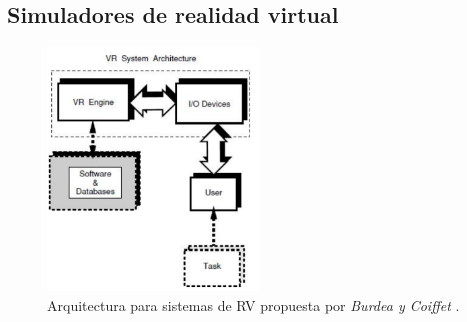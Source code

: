 \subsection{Simuladores de realidad virtual}
\label{art:simulador}

\begin{figure}[h]
   \centering
    \includegraphics[width=0.5\textwidth]{IMG/VRarq.PNG}
    \caption{Arquitectura para sistemas de \ac{RV} propuesta por \emph{Burdea y Coiffet} \cite{burdea2003virtual}. }
   \label{fig:RVarq}
\end{figure}

